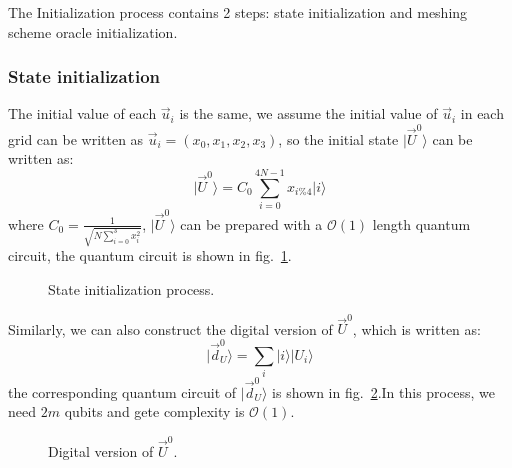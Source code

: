 \documentclass[%
 reprint,
 amsmath,amssymb,
pra,
]{revtex4-1}
\begin{document}
The Initialization process contains 2 steps: state initialization and meshing scheme oracle initialization.
\subsubsection{State initialization}
The initial value of  each $\vec{u}_i$ is the same, we assume the initial value of $\vec{u}_i$ in each grid can be written as $\vec{u}_i=(x_0,x_1,x_2,x_3)$, so the initial state  $|\vec{U}^0\rangle$ can be written as:
\begin{equation}
|\vec{U}^0\rangle=C_0\sum_{i=0}^{4N-1}{x_{i\%4}|i\rangle}
\end{equation}
where $C_0=\frac{1}{\sqrt{N\sum_{i=0}^{3}{x_i^2}}}$, $|\vec{U}^0\rangle$ can be prepared with a $\mathcal{O}(1)$ length quantum circuit, the quantum circuit is shown in fig.~\ref{state_initialization}.

\begin{figure}[htbp]
    \caption{State initialization process.  }
    \label{state_initialization}
\end{figure}
Similarly, we can also construct the digital version of $\vec{U}^0$, which is written as:
\begin{equation}
|\vec{d}_U^0\rangle=\sum_i{|i\rangle|U_i\rangle}
\end{equation}
the corresponding quantum circuit of $|\vec{d}_U^0\rangle$ is shown in fig.~\ref{digit_state_initialization}.In this process, we need $2m$ qubits and gete complexity is $\mathcal{O}(1)$.

\begin{figure}[htbp]
    \caption{Digital version of $\vec{U}^0$. }
    \label{digit_state_initialization}
\end{figure}
\end{document}
